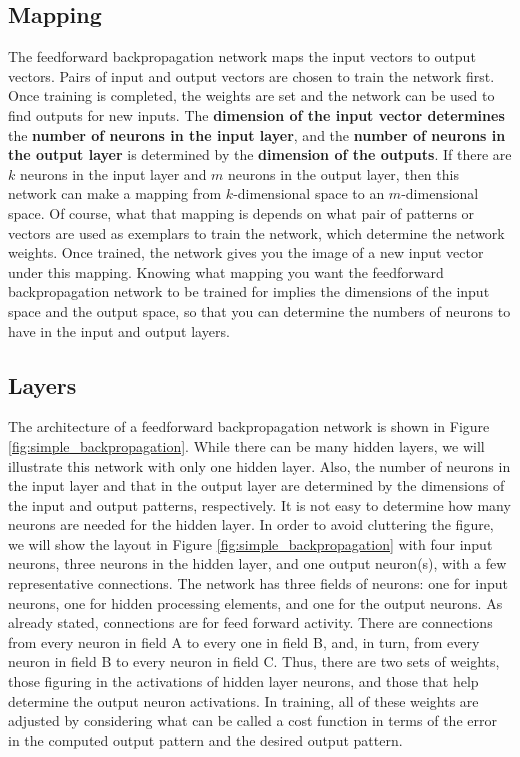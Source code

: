 \documentclass[12pt, right open]{memoir}
\begin{document}
\subsection{Mapping}
The feedforward backpropagation network maps the input vectors to output
vectors. Pairs of input and output vectors are chosen to train the network first.
Once training is completed, the weights are set and the network can be used to
find outputs for new inputs. The \textbf{dimension of the input vector determines} the
\textbf{number of neurons in the input layer}, and the \textbf{number of neurons in the output
layer} is determined by the \textbf{dimension of the outputs}. If there are $k$ neurons in
the input layer and $m$ neurons in the output layer, then this network can make a
mapping from $k$-dimensional space to an $m$-dimensional space. Of course,
what that mapping is depends on what pair of patterns or vectors are used as 
exemplars to train the network, which determine the network weights. Once
trained, the network gives you the image of a new input vector under this
mapping. Knowing what mapping you want the feedforward backpropagation
network to be trained for implies the dimensions of the input space and the
output space, so that you can determine the numbers of neurons to have in the
input and output layers.

\subsection{Layers}

The architecture of a feedforward backpropagation network is shown in Figure \ref{fig:simple_backpropagation}. While there can be many hidden layers, we will illustrate this network with only one hidden layer. Also, the number of neurons in the input layer and
that in the output layer are determined by the dimensions of the input and
output patterns, respectively. It is not easy to determine how many neurons are
needed for the hidden layer. In order to avoid cluttering the figure, we will
show the layout in Figure \ref{fig:simple_backpropagation} with four input neurons, three neurons in the
hidden layer, and one output neuron(s), with a few representative connections.
The network has three fields of neurons: one for input neurons, one for hidden
processing elements, and one for the output neurons. As already stated,
connections are for feed forward activity. There are connections from every
neuron in field A to every one in field B, and, in turn, from every neuron in
field B to every neuron in field C. Thus, there are two sets of weights, those
figuring in the activations of hidden layer neurons, and those that help
determine the output neuron activations. In training, all of these weights are
adjusted by considering what can be called a cost function in terms of the error
in the computed output pattern and the desired output pattern.
\end{document}

